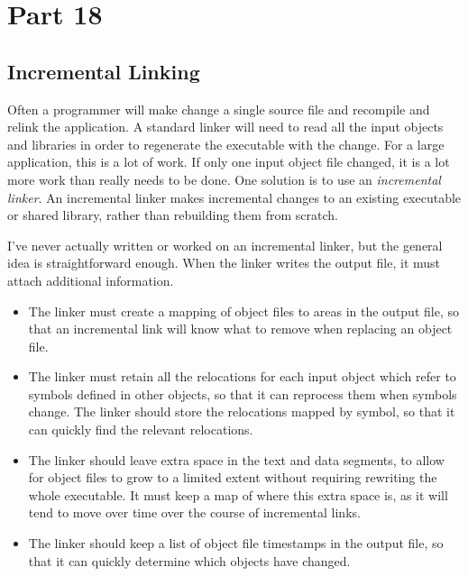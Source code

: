 \section{Part 18}

\subsection{Incremental Linking}

Often a programmer will make change a single source file and recompile and
relink the application. A standard linker will need to read all the input
objects and libraries in order to regenerate the executable with the change.
For a large application, this is a lot of work. If only one input object file
changed, it is a lot more work than really needs to be done. One solution is
to use an \emph{incremental linker}. An incremental linker makes incremental
changes to an existing executable or shared library, rather than rebuilding
them from scratch.

I've never actually written or worked on an incremental linker, but the general
idea is straightforward enough. When the linker writes the output file, it must
attach additional information.

\begin{itemize}
    \item The linker must create a mapping of object files to areas in the
          output file, so that an incremental link will know what to remove
          when replacing an object file.

    \item The linker must retain all the relocations for each input object
          which refer to symbols defined in other objects, so that it can
          reprocess them when symbols change. The linker should store the
          relocations mapped by symbol, so that it can quickly find the
          relevant relocations.

    \item The linker should leave extra space in the text and data segments, to
          allow for object files to grow to a limited extent without requiring
          rewriting the whole executable. It must keep a map of where this
          extra space is, as it will tend to move over time over the course of
          incremental links.

    \item The linker should keep a list of object file timestamps in the output
          file, so that it can quickly determine which objects have changed.
\end{itemize}

